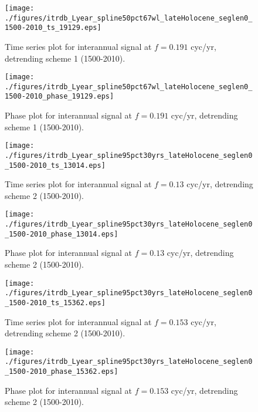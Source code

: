 \documentclass[phd,tocprelim]{cornell}
\begin{document}
\begin{figure}[!tbp]
\centering
\begin{minipage}[b]{0.45\textwidth}
\texttt{[image: ./figures/itrdb\_Lyear\_spline50pct67wl\_lateHolocene\_seglen0\_1500-2010\_ts\_19129.eps]}
\caption{Time series plot for interannual signal at $f=0.191$ cyc/yr, detrending scheme 1 (1500-2010).}
\label{ts1p4}
\end{minipage}
\hfill
\begin{minipage}[b]{0.45\textwidth}
\texttt{[image: ./figures/itrdb\_Lyear\_spline50pct67wl\_lateHolocene\_seglen0\_1500-2010\_phase\_19129.eps]}
\caption{Phase plot for interannual signal at $f=0.191$ cyc/yr, detrending scheme 1 (1500-2010).}
\label{map1p4}
\end{minipage}
\end{figure}


\clearpage
\newpage

\begin{figure}[!tbp]
\centering
\begin{minipage}[b]{0.45\textwidth}
\texttt{[image: ./figures/itrdb\_Lyear\_spline95pct30yrs\_lateHolocene\_seglen0\_1500-2010\_ts\_13014.eps]}
\caption{Time series plot for interannual signal at $f=0.13$ cyc/yr, detrending scheme 2 (1500-2010).}
\label{ts2p1}
\end{minipage}
\hfill
\begin{minipage}[b]{0.45\textwidth}
\texttt{[image: ./figures/itrdb\_Lyear\_spline95pct30yrs\_lateHolocene\_seglen0\_1500-2010\_phase\_13014.eps]}
\caption{Phase plot for interannual signal at $f=0.13$ cyc/yr, detrending scheme 2 (1500-2010).}
\label{map2p1}
\end{minipage}
\end{figure}

\begin{figure}[!tbp]
\centering
\begin{minipage}[b]{0.45\textwidth}
\texttt{[image: ./figures/itrdb\_Lyear\_spline95pct30yrs\_lateHolocene\_seglen0\_1500-2010\_ts\_15362.eps]}
\caption{Time series plot for interannual signal at $f=0.153$ cyc/yr, detrending scheme 2 (1500-2010).}
\label{ts2p2}
\end{minipage}
\hfill
\begin{minipage}[b]{0.45\textwidth}
\texttt{[image: ./figures/itrdb\_Lyear\_spline95pct30yrs\_lateHolocene\_seglen0\_1500-2010\_phase\_15362.eps]}
\caption{Phase plot for interannual signal at $f=0.153$ cyc/yr, detrending scheme 2 (1500-2010).}
\label{map2p2}
\end{minipage}
\end{figure}
\end{document}
